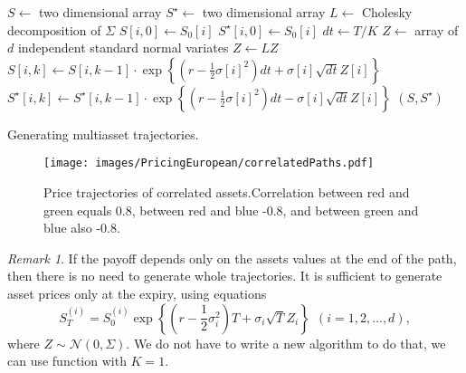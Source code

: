 \documentclass[a4paper,11pt, twoside]{book}
\theoremstyle{definition}
\theoremstyle{remark}
\newtheorem{remark}{Remark}[chapter]
\begin{document}
\begin{algorithm}
 \begin{algorithmic}[1]
  
  \State $S \gets$ two dimensional array 
  \State $S^\star \gets$ two dimensional array 
  \State $L \gets$ Cholesky decomposition of $\Sigma$ 
    \State $S[i,0] \gets S_0[i]$
    \State $S^\star[i,0] \gets S_0[i]$
  \EndFor
  \State $dt \gets T/K$
    \State $Z \gets$ array of $d$ independent standard normal variates
    \State $Z \gets LZ$ 
      \State $S[i, k] \gets S[i, k-1] \cdot \exp\left\{ (r - \frac{1}{2}\sigma[i]^2) dt + \sigma[i] \sqrt{dt} Z[i] \right\}$
      \State $S^\star[i, k] \gets S^\star[i, k-1] \cdot \exp\left\{ (r - \frac{1}{2}\sigma[i]^2) dt - \sigma[i] \sqrt{dt} Z[i] \right\}$
    \EndFor
  \EndFor
  \State \Return $(S, S^\star)$
  \EndFunction
 \end{algorithmic}
 \caption{Generating multiasset trajectories.}
 \label{alg:multi-tr}
\end{algorithm}

\begin{figure}
\centering
 \texttt{[image: images/PricingEuropean/correlatedPaths.pdf]}
\caption{Price trajectories of correlated assets.Correlation between red and green equals 0.8, between red and blue -0.8, and between green and blue also -0.8.}
\label{fig:corrPaths}
\end{figure}

\begin{remark}
 If the payoff depends only on the assets values at the end of the path, then there is no need to generate whole trajectories. It is sufficient to generate asset prices only at the expiry, using equations
 \[ S^{(i)}_T = S^{(i)}_0 \exp\left\{ (r - \frac{1}{2}\sigma_i^2)T + \sigma_i \sqrt{T} Z_i \right\} \ \ (i = 1,2,\ldots,d),\]
  where  $Z \sim \mathcal{N}(0, \Sigma)$. We do not have to write a new algorithm to do that, we can use function 
 with $K=1$.

\end{remark}
\end{document}
